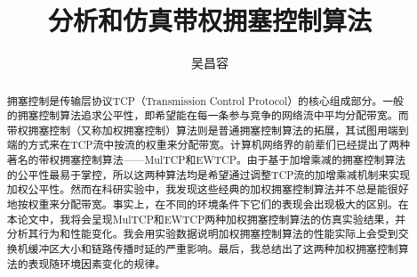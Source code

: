 \documentclass[winfonts]{njuthesis}
\title{分析和仿真带权拥塞控制算法}
\author{吴昌容}
\begin{document}
\maketitle

\begin{abstract}
  拥塞控制是传输层协议TCP（Transmission Control Protocol）的核心组成部分。一般的拥塞控制算法追求公平性，即希望能在每一条参与竞争的网络流中平均分配带宽。而带权拥塞控制（又称加权拥塞控制）算法则是普通拥塞控制算法的拓展，其试图用端到端的方式来在TCP流中按流的权重来分配带宽。计算机网络界的前辈们已经提出了两种著名的带权拥塞控制算法——MulTCP和EWTCP。由于基于加增乘减的拥塞控制算法的公平性最易于掌控，所以这两种算法均是希望通过调整TCP流的加增乘减机制来实现加权公平性。然而在科研实验中，我发现这些经典的加权拥塞控制算法并不总是能很好地按权重来分配带宽。事实上，在不同的环境条件下它们的表现会出现极大的区别。在本论文中，我将会呈现MulTCP和EWTCP两种加权拥塞控制算法的仿真实验结果，并分析其行为和性能变化。我会用实验数据说明加权拥塞控制算法的性能实际上会受到交换机缓冲区大小和链路传播时延的严重影响。最后，我总结出了这两种加权拥塞控制算法的表现随环境因素变化的规律。
\end{abstract}
\end{document}
